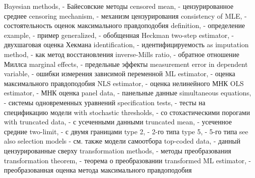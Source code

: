 Bayesian methods, - Байесовские методы
censored mean, - цензурированное среднее
censoring mechanism, - механизм цензурирования
consistency of MLE, - состоятельность оценок максимального правдоподобия
definition, - определение
example, - пример
generalized, - обобщенная
Heckman two-step estimator, - двухшаговая оценка Хекмана
identification, - идентифицируемость
as imputation method, - как метод восстановления
inverse-Mills ratio, - обратное отношение Миллса
marginal effects, - предельные эффекты
measurement error in dependent variable, - ошибки измерения зависимой переменной
ML estimator, - оценка максимального правдоподобия
NLS estimator, - оценка нелинейного МНК
OLS estimator, - МНК оценка
panel data, - панельные данные
simultaneous equations, - системы одновременных уравнений
specification tests, - тесты на спецификацию модели
with stochastic thresholds, - со стохастическими порогами
with truncated data, - с усеченными данными
truncated mean, - усеченное средние
two-limit, - с двумя границами
type 2, - 2-го типа
type 5, - 5-го типа
see also selection models - см. также модели самоотбора
top-coded data, - данный цензурированные сверху
transformation methods, - методы преобразования
transformation theorem, - теорема о преобразовании
transformed ML estimator, - преобразованная оценка метода максимального правдоподобия

